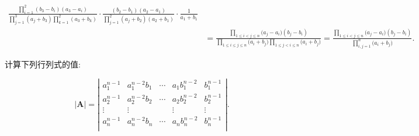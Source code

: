 \documentclass[../../main.tex]{subfiles}
\begin{document}
\begin{solution}
\begin{align*}
\frac{\prod\limits_{i=1}^2{\left( b_3-b_i \right) \left( a_3-a_i \right)}}{\prod\limits_{j=1}^3{\left( a_j+b_3 \right) \prod\limits_{k=1}^2{\left( a_3+b_k \right)}}}\cdot \frac{\left( b_2-b_1 \right) \left( a_2-a_1 \right)}{\prod\limits_{j=1}^2{\left( a_j+b_2 \right) \left( a_2+b_1 \right)}}\cdot \frac{1}{a_1+b_1}
\\
&=\frac{\prod\limits_{1\le i<j\le n}{(a_j}-a_i)(b_j-b_i)}{\prod\limits_{1\le i\le j\le n}{(a_i}+b_j)\prod\limits_{1\le j<i\le n}{(a_i}+b_j)}=\frac{\prod\limits_{1\le i<j\le n}{(a_j}-a_i)(b_j-b_i)}{\prod\limits_{i,j=1}^n{(a_i}+b_j)}.
\nonumber
\end{align*}
\end{solution}

\begin{proposition}\label{proposition:Vandermode行列式的"卷积"形式}
计算下列行列式的值:

\[
|\boldsymbol{A}|=\left| \begin{matrix}
a_{1}^{n-1}&		a_{1}^{n-2}b_1&		\cdots&		a_1b_{1}^{n-2}&		b_{1}^{n-1}\\
a_{2}^{n-1}&		a_{2}^{n-2}b_2&		\cdots&		a_2b_{2}^{n-2}&		b_{2}^{n-1}\\
\vdots&		\vdots&		&		\vdots&		\vdots\\
a_{n}^{n-1}&		a_{n}^{n-2}b_n&		\cdots&		a_nb_{n}^{n-2}&		b_{n}^{n-1}\\
\end{matrix} \right|.
\]
\end{proposition}
\end{document}
